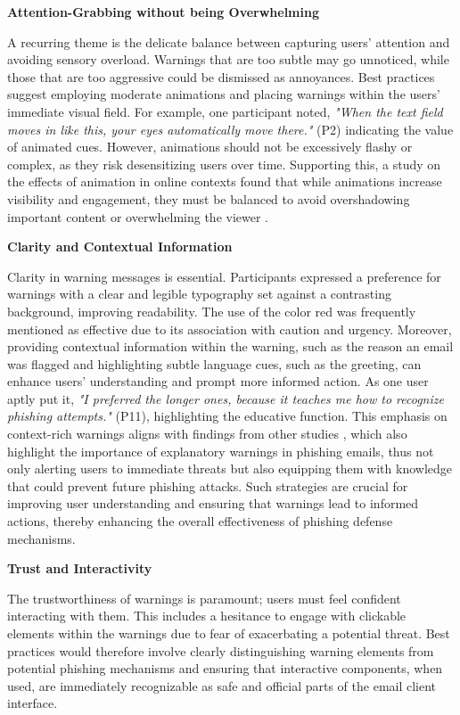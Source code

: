 \documentclass[
  a4paper,  %
  twoside,  %
  bibliography=totoc,
  headsepline,
  cleardoublepage=empty,
  parskip=half,
  draft=false
]{scrbook}
\begin{document}
\textbf{Attention-Grabbing without being Overwhelming}

A recurring theme is the delicate balance between capturing users’ attention and avoiding sensory overload. Warnings that are too subtle may go unnoticed, while those that are too aggressive could be dismissed as annoyances. Best practices suggest employing moderate animations and placing warnings within the users' immediate visual field. For example, one participant noted, \textit{"When the text field moves in like this, your eyes automatically move there."} (P2) indicating the value of animated cues. However, animations should not be excessively flashy or complex, as they risk desensitizing users over time. Supporting this, a study on the effects of animation in online contexts found that while animations increase visibility and engagement, they must be balanced to avoid overshadowing important content or overwhelming the viewer \cite{cheung}.

\textbf{Clarity and Contextual Information}

Clarity in warning messages is essential. Participants expressed a preference for warnings with a clear and legible typography set against a contrasting background, improving readability. The use of the color red was frequently mentioned as effective due to its association with caution and urgency. \newline 
Moreover, providing contextual information within the warning, such as the reason an email was flagged and highlighting subtle language cues, such as the greeting, can enhance users’ understanding and prompt more informed action. As one user aptly put it, \textit{"I preferred the longer ones, because it teaches me how to recognize phishing attempts."} (P11), highlighting the educative function. \newline
This emphasis on context-rich warnings aligns with findings from other studies \cite{buono, aneke}, which also highlight the importance of explanatory warnings in phishing emails, thus not only alerting users to immediate threats but also equipping them with knowledge that could prevent future phishing attacks. Such strategies are crucial for improving user understanding and ensuring that warnings lead to informed actions, thereby enhancing the overall effectiveness of phishing defense mechanisms.

\textbf{Trust and Interactivity}

The trustworthiness of warnings is paramount; users must feel confident interacting with them. This includes a hesitance to engage with clickable elements within the warnings due to fear of exacerbating a potential threat. Best practices would therefore involve clearly distinguishing warning elements from potential phishing mechanisms and ensuring that interactive components, when used, are immediately recognizable as safe and official parts of the email client interface.
\end{document}
